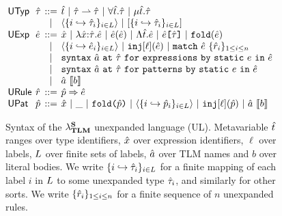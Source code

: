 \documentclass[acmsmall,review,anonymous]{acmart}\settopmatter{printfolios=true,printccs=false,printacmref=false}
\begin{document}
% 

\begin{figure}[t!]
\begin{minipage}{\textwidth}
\small
$\arraycolsep=2pt\begin{array}{llcl}
\mathsf{UTyp} & \utau & ::= & 
\ut ~\vert~ 
\parr{\utau}{\utau} ~\vert~
\forallt{\ut}{\utau} ~\vert~
\rect{\ut}{\utau}\\
& & \vert & 
\prodt{\mapschema{\utau}{i}{\labelset}} ~\vert~
\sumt{\mapschema{\utau}{i}{\labelset}}\\
\mathsf{UExp} & \ue & ::= & 
\ux ~\vert~
\lam{\ux}{\utau}{\ue} ~\vert~
\ap{\ue}{\ue} ~\vert~
\Lam{\ut}{\ue} ~\vert~
\App{\ue}{\utau} ~\vert~
\fold{\ue} \\
&& \vert & \tpl{\mapschema{\ue}{i}{\labelset}} ~\vert~
\inj{\ell}{\ue} ~\vert~
\matchwith{\ue}{\seqschemaX{\urv}}
 \\
& & \vert & \uesyntaxq{\tsmv}{\utau}{e}{\ue} \\   
& & \vert & \usyntaxup{\tsmv}{\utau}{e}{\ue} \\
&&\vert&  \utsmap{\tsmv}{b} \\
\mathsf{URule} & \urv & ::= & 
\matchrule{\upv}{\ue} \\
\mathsf{UPat} & \upv & ::= & 
\ux ~\vert~
\wildp ~\vert~ 
\foldp{\upv} ~\vert~
\tplp{\mapschema{\upv}{i}{\labelset}} ~\vert~
\injp{\ell}{\upv} ~\vert~
\utsmap{\tsmv}{b}

\end{array}$
\end{minipage}
\caption[Syntax of the $\miniVersePat$ unexpanded language (UL)]{Syntax of the $\miniVersePat$ unexpanded language (UL). Metavariable $\ut$ ranges over type identifiers, $\ux$ over expression identifiers, $\ell$ over labels, $\labelset$ over finite sets of labels, $\tsmv$ over TLM names and $b$ over literal bodies. We write $\mapschema{\utau}{i}{\labelset}$ for a finite mapping of each label $i$ in $\labelset$ to some unexpanded type $\utau_i$, and similarly for other sorts. We write $\seqschemaX{\urv}$ for a finite sequence of $n$ unexpanded rules.
}
\label{fig:U-unexpanded-terms}
\end{figure}
\end{document}

